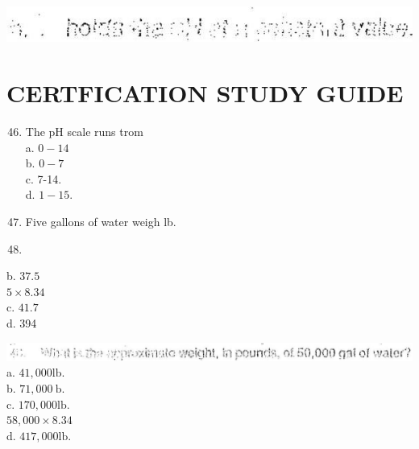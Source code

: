 \documentclass[10pt]{article}
\begin{document}
\includegraphics[max width=\textwidth]{2022_11_11_ca6a6c1a0324ee23e523g-23}

\section{CERTFICATION STUDY GUIDE}
\begin{enumerate}
  \setcounter{enumi}{45}
  \item The pH scale runs trom\\
a. $0-14$\\
b. $0-7$\\
c. 7-14.\\
d. $1-15$.

  \item Five gallons of water weigh lb.

  \item 
\end{enumerate}

b. $37.5$\\
$5 \times 8.34$\\
c. $41.7$\\
d. 394

\includegraphics[max width=\textwidth]{2022_11_11_ca6a6c1a0324ee23e523g-24}\\
a. $41,000 \mathrm{lb}$.\\
b. $71,000 \mathrm{~b}$.\\
c. $170,000 \mathrm{lb}$.\\
$58,000 \times 8.34$\\
d. $417,000 \mathrm{lb}$.
\end{document}
